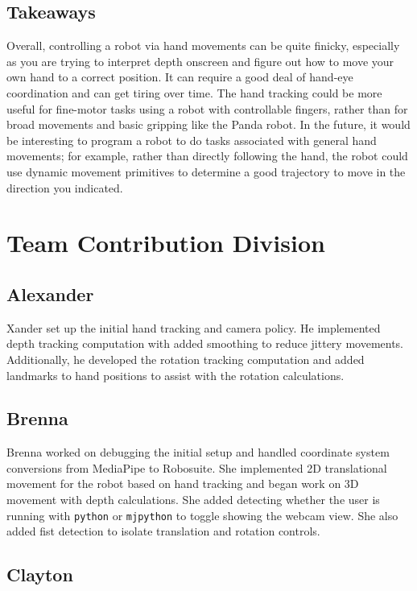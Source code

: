 \documentclass{article}
\begin{document}
\subsection{Takeaways}Overall, controlling a robot via hand movements can be
quite finicky, especially as you are trying to interpret depth onscreen and
figure out how to move your own hand to a correct position. It can require a
good deal of hand-eye coordination and can get tiring over time. The hand
tracking could be more useful for fine-motor tasks using a robot with
controllable fingers, rather than for broad movements and basic gripping like
the Panda robot. In the future, it would be interesting to program a robot to
do tasks associated with general hand movements; for example, rather than
directly following the hand, the robot could use dynamic movement primitives to
determine a good trajectory to move in the direction you indicated. 


\section{Team Contribution Division}
\subsection*{Alexander}

Xander set up the initial hand tracking and camera policy. He implemented depth
tracking computation with added smoothing to reduce jittery movements.
Additionally, he developed the rotation tracking computation and added
landmarks to hand positions to assist with the rotation calculations.

\subsection*{Brenna}

Brenna worked on debugging the initial setup and handled coordinate system
conversions from MediaPipe to Robosuite. She implemented 2D translational
movement for the robot based on hand tracking and began work on 3D movement
with depth calculations. She added detecting whether the user is running with
\texttt{python} or \texttt{mjpython} to toggle showing the webcam view. She
also added fist detection to isolate translation and rotation controls. 

\subsection*{Clayton}
\end{document}
